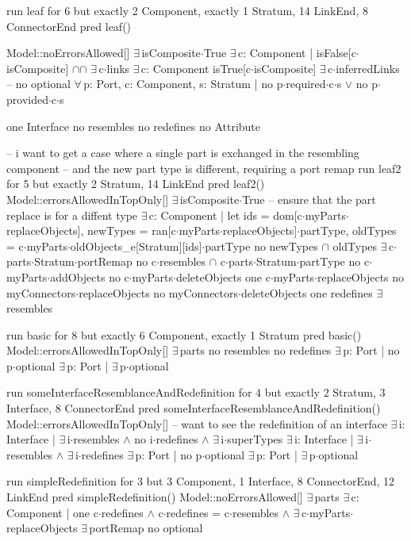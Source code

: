 run leaf for 6 but exactly 2 Component, exactly 1 Stratum, 14 LinkEnd, 8 ConnectorEnd
pred leaf()
{
  Model::noErrorsAllowed[]
  $\exists\,$isComposite$\cdot$True
  $\exists\,$c: Component | isFalse[c$\cdot$isComposite] $\cap$$\cap$ $\exists\,$c$\cdot$links
  $\exists\,$c: Component
  {
    isTrue[c$\cdot$isComposite]
    $\exists\,$c$\cdot$inferredLinks
  }
--  no optional
  $\forall\,$p: Port, c: Component, s: Stratum |
    no p$\cdot$required$\cdot$c$\cdot$s $\vee$ no p$\cdot$provided$\cdot$c$\cdot$s
    
  one Interface
  no resembles
  no redefines
  no Attribute
}

-- i want to get a case where a single part is exchanged in the resembling component
-- and the new part type is different, requiring a port remap
run leaf2 for 5 but exactly 2 Stratum, 14 LinkEnd
pred leaf2()
{
  Model::errorsAllowedInTopOnly[]
  $\exists\,$isComposite$\cdot$True
  -- ensure that the part replace is for a diffent type
  $\exists\,$c: Component |
  let ids = dom[c$\cdot$myParts$\cdot$replaceObjects],
      newTypes = ran[c$\cdot$myParts$\cdot$replaceObjects]$\cdot$partType,
      oldTypes = c$\cdot$myParts$\cdot$oldObjects_e[Stratum][ids]$\cdot$partType
  {
    no newTypes $\cap$ oldTypes
    $\exists\,$c$\cdot$parts$\cdot$Stratum$\cdot$portRemap
    no c$\cdot$resembles $\cap$ c$\cdot$parts$\cdot$Stratum$\cdot$partType
    no c$\cdot$myParts$\cdot$addObjects
    no c$\cdot$myParts$\cdot$deleteObjects
    one c$\cdot$myParts$\cdot$replaceObjects
  }
  no myConnectors$\cdot$replaceObjects
  no myConnectors$\cdot$deleteObjects
  one redefines
  $\exists\,$resembles
}

run basic for 8 but exactly 6 Component, exactly 1 Stratum
pred basic()
{
  Model::errorsAllowedInTopOnly[]
  $\exists\,$parts
  no resembles
  no redefines
  $\exists\,$p: Port | no p$\cdot$optional
  $\exists\,$p: Port | $\exists\,$p$\cdot$optional
}

  
run someInterfaceResemblanceAndRedefinition for 4 but exactly 2 Stratum, 3 Interface, 8 ConnectorEnd
pred someInterfaceResemblanceAndRedefinition()
{
  Model::errorsAllowedInTopOnly[]
  -- want to see the redefinition of an interface
  $\exists\,$i: Interface | $\exists\,$i$\cdot$resembles $\wedge$ no i$\cdot$redefines $\wedge$ $\exists\,$i$\cdot$superTypes
  $\exists\,$i: Interface | $\exists\,$i$\cdot$resembles $\wedge$ $\exists\,$i$\cdot$redefines
  $\exists\,$p: Port | no p$\cdot$optional
  $\exists\,$p: Port | $\exists\,$p$\cdot$optional
}


run simpleRedefinition for 3 but 3 Component, 1 Interface, 8 ConnectorEnd, 12 LinkEnd
pred simpleRedefinition()
{
  Model::noErrorsAllowed[]
  $\exists\,$parts
  $\exists\,$c: Component |
    one c$\cdot$redefines $\wedge$ c$\cdot$redefines = c$\cdot$resembles $\wedge$ $\exists\,$c$\cdot$myParts$\cdot$replaceObjects
  $\exists\,$portRemap
  no optional
}

